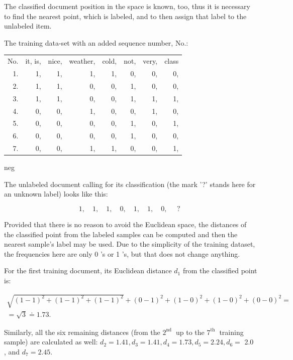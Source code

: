 \documentclass[10pt]{book}
\begin{document}
The classified document position in the space is known, too, thus it is necessary to find the nearest point, which is labeled, and to then assign that label to the unlabeled item.

The training data-set with an added sequence number, No.:

\begin{center}
\begin{tabular}{rrrrrrrr}
No. & it, is, & nice, & weather, & cold, & not, & very, & class \\
1. & 1, & 1, & 1, & 1, & 0, & 0, & 0, \\
2. & 1, & 1, & 0, & 0, & 1, & 0, & 0, \\
3. & 1, & 1, & 0, & 0, & 1, & 1, & 1, \\
4. & 0, & 0, & 1, & 0, & 0, & 1, & 0, \\
5. & 0, & 0, & 0, & 0, & 1, & 0, & 1, \\
6. & 0, & 0, & 0, & 0, & 1, & 0, & 0, \\
7. & 0, & 0, & 1, & 1, & 0, & 0, & 1, \\
\end{tabular}
\end{center} neg

The unlabeled document calling for its classification (the mark '?' stands here for an unknown label) looks like this:

$$
1, \quad 1, \quad 1, \quad 0, \quad 1, \quad 1, \quad 0, \quad \text { ? }
$$

Provided that there is no reason to avoid the Euclidean space, the distances of the classified point from the labeled samples can be computed and then the nearest sample's label may be used. Due to the simplicity of the training dataset, the frequencies here are only 0 's or 1 's, but that does not change anything.

For the first training document, its Euclidean distance $d_{1}$ from the classified point is:

$$
\begin{gathered}
\sqrt{(1-1)^{2}+(1-1)^{2}+(1-1)^{2}}+(0-1)^{2}+(1-0)^{2}+(1-0)^{2}+(0-0)^{2}= \\
=\sqrt{3} \doteq 1.73 .
\end{gathered}
$$

Similarly, all the six remaining distances (from the $2^{\text {nd }}$ up to the $7^{\text {th }}$ training sample) are calculated as well: $d_{2}=1.41, d_{3}=1.41, d_{4}=1.73, d_{5}=2.24, d_{6}=$ 2.0 , and $d_{7}=2.45$.
\end{document}

